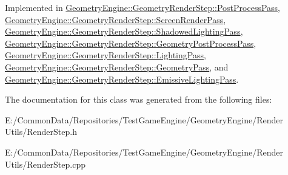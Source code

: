 Implemented in \mbox{\hyperlink{class_geometry_engine_1_1_geometry_render_step_1_1_post_process_pass_a4d41ac05dcf1533296a7fbda443f38fb}{Geometry\+Engine\+::\+Geometry\+Render\+Step\+::\+Post\+Process\+Pass}}, \mbox{\hyperlink{class_geometry_engine_1_1_geometry_render_step_1_1_screen_render_pass_ac24f21e3a457408b2163bc51c2ebb8f2}{Geometry\+Engine\+::\+Geometry\+Render\+Step\+::\+Screen\+Render\+Pass}}, \mbox{\hyperlink{class_geometry_engine_1_1_geometry_render_step_1_1_shadowed_lighting_pass_ad188a4d3f33fb153459cf3483ff3df23}{Geometry\+Engine\+::\+Geometry\+Render\+Step\+::\+Shadowed\+Lighting\+Pass}}, \mbox{\hyperlink{class_geometry_engine_1_1_geometry_render_step_1_1_geometry_post_process_pass_ae359def8e0ef34a78454307b078352b6}{Geometry\+Engine\+::\+Geometry\+Render\+Step\+::\+Geometry\+Post\+Process\+Pass}}, \mbox{\hyperlink{class_geometry_engine_1_1_geometry_render_step_1_1_lighting_pass_a3f8631da2e61e9a9092a53395b320ecb}{Geometry\+Engine\+::\+Geometry\+Render\+Step\+::\+Lighting\+Pass}}, \mbox{\hyperlink{class_geometry_engine_1_1_geometry_render_step_1_1_geometry_pass_a8c508e9f74abd051a8908bb1a568ea50}{Geometry\+Engine\+::\+Geometry\+Render\+Step\+::\+Geometry\+Pass}}, and \mbox{\hyperlink{class_geometry_engine_1_1_geometry_render_step_1_1_emissive_lighting_pass_a03eb4da70618421703fc71d61669321d}{Geometry\+Engine\+::\+Geometry\+Render\+Step\+::\+Emissive\+Lighting\+Pass}}.



The documentation for this class was generated from the following files\+:\begin{DoxyCompactItemize}
\item 
E\+:/\+Common\+Data/\+Repositories/\+Test\+Game\+Engine/\+Geometry\+Engine/\+Render Utils/Render\+Step.\+h\item 
E\+:/\+Common\+Data/\+Repositories/\+Test\+Game\+Engine/\+Geometry\+Engine/\+Render Utils/Render\+Step.\+cpp\end{DoxyCompactItemize}
